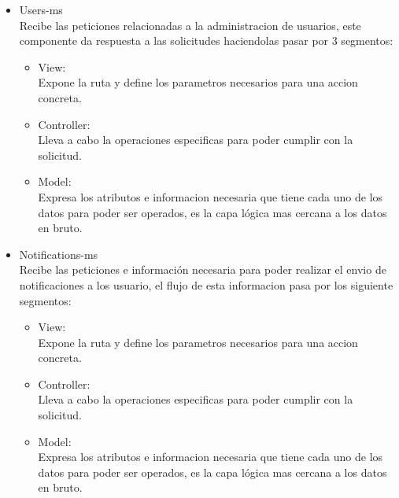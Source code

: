 \begin{itemize}
\begin{itemize}
        \item Users-ms \\
        Recibe las peticiones relacionadas a la administracion de usuarios, este componente da respuesta a las solicitudes haciendolas pasar por 3 segmentos:
        \begin{itemize}
            \item View: \\
            Expone la ruta y define los parametros necesarios para una accion concreta.
            \item Controller: \\
            Lleva a cabo la operaciones especificas para poder cumplir con la solicitud.
            \item Model: \\
            Expresa los atributos e informacion necesaria que tiene cada uno de los datos para poder ser operados, es la capa lógica mas cercana a los datos en bruto.
        \end{itemize}
        
        \item Notifications-ms \\
        Recibe las peticiones e información necesaria para poder realizar el envio de notificaciones a los usuario, el flujo de esta informacion pasa por los siguiente segmentos:
        \begin{itemize}
            \item View: \\
            Expone la ruta y define los parametros necesarios para una accion concreta.
            \item Controller: \\
            Lleva a cabo la operaciones especificas para poder cumplir con la solicitud.
            \item Model: \\
            Expresa los atributos e informacion necesaria que tiene cada uno de los datos para poder ser operados, es la capa lógica mas cercana a los datos en bruto.
        \end{itemize}
        

\end{itemize}
\end{itemize}
